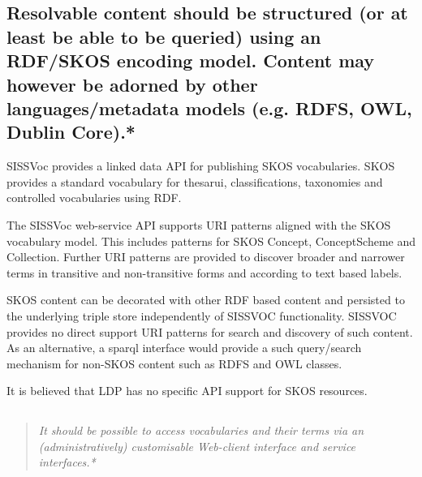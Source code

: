\documentclass[10pt,a4paper]{article}
\newenvironment{italicquotes}
{\begin{quote}\itshape}
{\end{quote}}
\begin{document}
\begin{flushleft}
\subsection{Resolvable content should be structured (or at least be able to be queried)
  using an RDF/SKOS encoding model. Content may however be adorned by other
  languages/metadata models (e.g. RDFS, OWL, Dublin Core).* }

  SISSVoc provides a linked data API for publishing SKOS vocabularies.  SKOS
provides a standard vocabulary for thesarui, classifications, taxonomies and
controlled vocabularies using RDF.

  The SISSVoc web-service API supports URI patterns aligned with the SKOS
vocabulary model. This includes patterns for SKOS Concept,
ConceptScheme and Collection. Further URI patterns are provided to discover
broader and narrower terms in transitive and non-transitive forms and according
to text based labels. 

  SKOS content can be decorated with other RDF based
content and persisted to the underlying triple store independently of SISSVOC
functionality. SISSVOC provides
no direct support URI patterns for search and discovery of such content. As an
alternative, a sparql interface would provide a
such query/search mechanism for non-SKOS content such as RDFS and OWL classes. 

It is believed that LDP has no specific API support for SKOS resources.

% 
% 
% 

  \subsection{} 
  \begin{italicquotes} 
  It should be possible to access vocabularies and their terms via an 
  (administratively) customisable Web-client interface and service interfaces.*


\end{italicquotes}
\end{flushleft}
\end{document}
